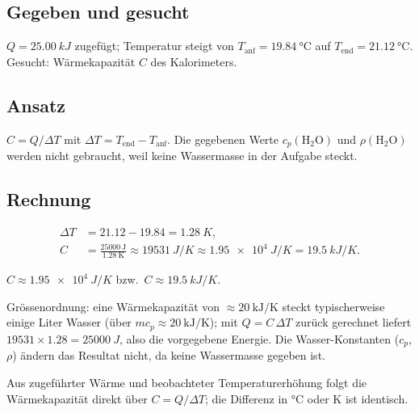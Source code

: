 
\subsection*{Gegeben und gesucht}
$Q = \qty{25.00}{kJ}$ zugefügt; Temperatur steigt von
$T_{\text{anf}} = \qty{19.84}{\celsius}$ auf
$T_{\text{end}} = \qty{21.12}{\celsius}$. Gesucht: Wärmekapazität
$C$ des Kalorimeters.

\subsection*{Ansatz}
$C = Q/\Delta T$ mit $\Delta T = T_{\text{end}} - T_{\text{anf}}$. Die
gegebenen Werte $c_p(\mathrm{H_2O})$ und $\rho(\mathrm{H_2O})$ werden nicht
gebraucht, weil keine Wassermasse in der Aufgabe steckt.

\subsection*{Rechnung}
\begin{align*}
  \Delta T &= 21.12 - 19.84 = \qty{1.28}{K}, \\
  C &= \frac{25000\ \mathrm{J}}{1.28\ \mathrm{K}}
  \approx \qty{19531}{J/K}
  \approx \qty{1.95e4}{J/K}
  = \qty{19.5}{kJ/K}.
\end{align*}

\begin{ergebnis}
$C \approx \qty{1.95e4}{J/K}$ bzw.\ $C \approx \qty{19.5}{kJ/K}$.
\end{ergebnis}

\begin{kontrolle}
Grössenordnung: eine Wärmekapazität von $\approx 20\ \mathrm{kJ/K}$ steckt
typischerweise einige Liter Wasser (über $m c_p \approx
20\ \mathrm{kJ/K}$); mit $Q = C\,\Delta T$ zurück gerechnet liefert
$19531\times 1.28 = \qty{25000}{J}$, also die vorgegebene Energie. Die
Wasser-Konstanten ($c_p$, $\rho$) ändern das Resultat nicht, da keine
Wassermasse gegeben ist.
\end{kontrolle}

\begin{merksatz}
Aus zugeführter Wärme und beobachteter Temperaturerhöhung folgt die
Wärmekapazität direkt über $C = Q/\Delta T$; die Differenz in °C oder K ist
identisch.
\end{merksatz}
